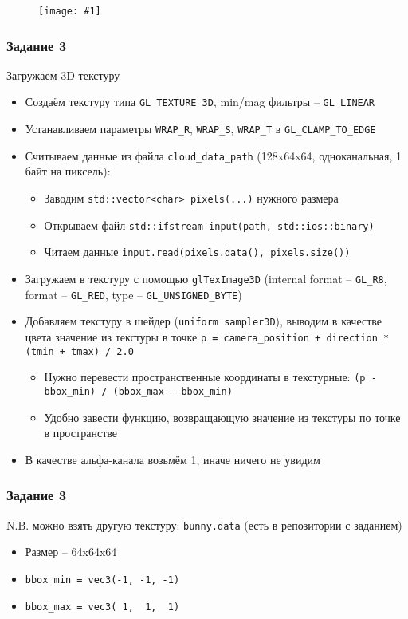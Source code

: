 \documentclass{beamer}
\newcommand{\slideimage}[1]{
  \begin{figure}
    \begin{adjustbox}{width=\textwidth, totalheight=\textheight-2\baselineskip-2\baselineskip,keepaspectratio}
      \texttt{[image: \#1]}
    \end{adjustbox}
  \end{figure}
}
\begin{document}
\begin{frame}[fragile]
\slideimage{2.png}
\end{frame}

\begin{frame}[fragile]
\frametitle{Задание 3}
\fontsize{8pt}{8pt}\selectfont
Загружаем 3D текстуру
\begin{itemize}
\item Создаём текстуру типа \verb|GL_TEXTURE_3D|, min/mag фильтры -- \verb|GL_LINEAR|
\item Устанавливаем параметры \verb|WRAP_R|, \verb|WRAP_S|, \verb|WRAP_T| в \verb|GL_CLAMP_TO_EDGE|
\item Считываем данные из файла \verb|cloud_data_path| (128x64x64, одноканальная, 1 байт на пиксель):
\begin{itemize}
\fontsize{8pt}{8pt}\selectfont
\item Заводим \verb|std::vector<char> pixels(...)| нужного размера
\item Открываем файл \verb|std::ifstream input(path, std::ios::binary)|
\item Читаем данные \verb|input.read(pixels.data(), pixels.size())|
\end{itemize}
\item Загружаем в текстуру с помощью \verb|glTexImage3D| (internal format -- \verb|GL_R8|, format -- \verb|GL_RED|, type -- \verb|GL_UNSIGNED_BYTE|)
\item Добавляем текстуру в шейдер (\verb|uniform sampler3D|), выводим в качестве цвета значение из текстуры в точке \verb|p = camera_position + direction * (tmin + tmax) / 2.0|
\begin{itemize}
\fontsize{8pt}{8pt}\selectfont
\item Нужно перевести пространственные координаты в текстурные: \verb|(p - bbox_min) / (bbox_max - bbox_min)|
\item Удобно завести функцию, возвращающую значение из текстуры по точке в пространстве
\end{itemize}
\item В качестве альфа-канала возьмём 1, иначе ничего не увидим
\end{itemize}
\end{frame}

\begin{frame}[fragile]
\frametitle{Задание 3}
N.B. можно взять другую текстуру: \verb|bunny.data| (есть в репозитории с заданием)
\begin{itemize}
\item Размер -- 64x64x64
\item \verb|bbox_min = vec3(-1, -1, -1)|
\item \verb|bbox_max = vec3( 1,  1,  1)|
\end{itemize}
\end{frame}
\end{document}
